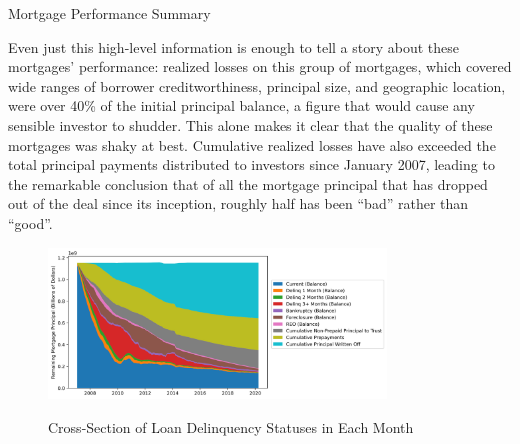 \documentclass[12pt]{article}
\begin{document}
\begin{table}[h]
	\centering
	\caption{Mortgage Performance Summary}
	
	
	\label{tab:table_deal_summary}
\end{table}

Even just this high-level information is enough to tell a story about these mortgages’ performance: realized losses on this group of mortgages, which covered wide ranges of borrower creditworthiness, principal size, and geographic location, were over 40\% of the initial principal balance, a figure that would cause any sensible investor to shudder. This alone makes it clear that the quality of these mortgages was shaky at best. Cumulative realized losses have also exceeded the total principal payments distributed to investors since January 2007, leading to the remarkable conclusion that of all the mortgage principal that has dropped out of the deal since its inception, roughly half has been “bad” rather than “good”.

\begin{figure}[h]
	\centering
	\caption{Cross-Section of Loan Delinquency Statuses in Each Month}
	\includegraphics[width=0.8\textwidth]{../figures/stackplot_delinq_status_with_writeoffs}
	\label{fig:stackplot_delinq_status_with_writeoffs}
\end{figure}
\end{document}
